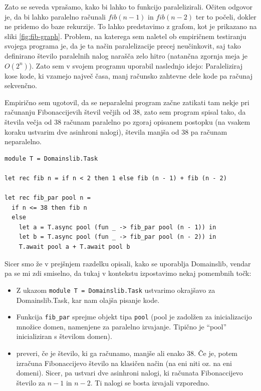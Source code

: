 \documentclass[mat1, tisk]{fmfdelo}
\begin{document}
Zato se seveda vprašamo, kako bi lahko to funkcijo paralelizirali. Očiten odgovor je, da bi lahko paralelno računali
$fib(n-1)$ in $fib(n-2)$ ter to počeli, dokler ne pridemo do baze rekurzije. To lahko predstavimo z grafom, kot je
prikazano na sliki \ref{fig:fib-graph}. Problem, na katerega sem naletel ob empiričnem testiranju svojega programa
je, da je ta način paralelizacije precej neučinkovit, saj tako definirano število paralelnih nalog narašča zelo hitro
(natančna zgornja meja je $O(2^n)$).
Zato sem v svojem programu uporabil naslednjo idejo: Paraleliziraj kose kode, ki vzamejo največ časa, 
manj računsko zahtevne dele kode pa računaj sekvenčno.

Empirično sem ugotovil, da se neparalelni program začne zatikati tam nekje pri računanju Fibonaccijevih števil
večjih od $38$, zato sem program spisal tako, da števila večja od $38$ računam paralelno po zgoraj opisanem postopku
(na vsakem koraku ustvarim dve asinhroni nalogi), števila manjša od $38$ pa računam neparalelno.

\begin{lstlisting}
module T = Domainslib.Task

let rec fib n = if n < 2 then 1 else fib (n - 1) + fib (n - 2)

let rec fib_par pool n =
  if n <= 38 then fib n
  else
    let a = T.async pool (fun _ -> fib_par pool (n - 1)) in
    let b = T.async pool (fun _ -> fib_par pool (n - 2)) in
    T.await pool a + T.await pool b
\end{lstlisting}

Sicer smo že v prejšnjem razdelku opisali, kako se uporablja Domainslib, vendar pa se mi zdi smiselno, da tukaj
v kontekstu izpostavimo nekaj pomembnih točk:
\begin{itemize}
  \item Z ukazom \texttt{module T = Domainslib.Task} ustvarimo okrajšavo za Domainslib.Task, kar nam olajša pisanje kode.
  \item Funkcija \texttt{fib\_par} sprejme objekt tipa \texttt{pool} (pool je zadolžen za inicializacijo množice domen, namenjene za 
  paralelno izvajanje. Tipično je ``pool'' inicializiran s številom domen).
  \item preveri, če je število, ki ga računamo, manjše ali enako 38. 
        Če je, potem izračuna Fibonaccijevo število na klasičen način (na eni niti oz. na eni domeni).
        Sicer, pa ustvari dve asinhroni nalogi, ki računata Fibonaccijevo število za $n-1$ in $n-2$. 
        Ti nalogi se bosta izvajali vzporedno.
\end{itemize}
\end{document}
